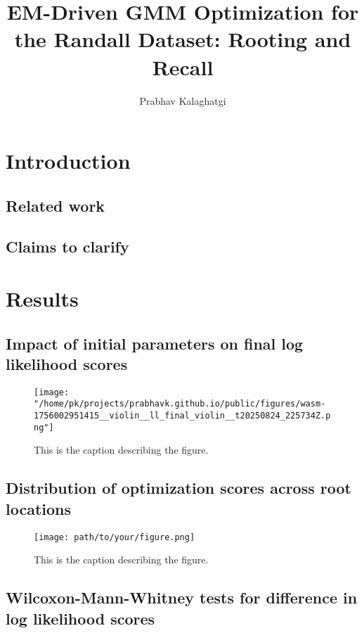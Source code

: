 \documentclass[]{article}
\title{EM-Driven GMM Optimization for the Randall Dataset: Rooting and Recall}
\author[1]{Prabhav Kalaghatgi}
\affil[1]{Independent Researcher, Hyderabad, India}
\begin{document}
	
	\maketitle
	
	\begin{abstract}
		
	\end{abstract}
	
	\section{Introduction}	
		\subsection*{Related work}
		\subsection*{Claims to clarify}
	\section{Results}		
		\subsection{Impact of initial parameters on final log likelihood scores}
		\begin{figure}[htbp]
			\centering
			\texttt{[image: "/home/pk/projects/prabhavk.github.io/public/figures/wasm-1756002951415\_\_violin\_\_ll\_final\_violin\_\_t20250824\_225734Z.png"]}
			\caption{This is the caption describing the figure.}
			\label{fig:my_label}
		\end{figure}
		
		\subsection{Distribution of optimization scores across root locations}
		\begin{figure}[htbp]
			\centering
			\texttt{[image: path/to/your/figure.png]}
			\caption{This is the caption describing the figure.}
			\label{fig:my_label}
		\end{figure}
		
		\subsection{Wilcoxon-Mann-Whitney tests for difference in log likelihood scores}
\end{document}
